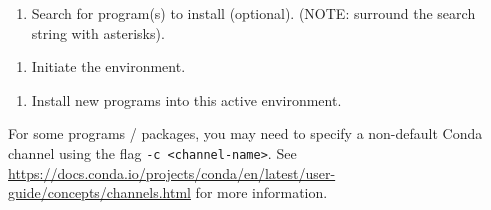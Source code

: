 \documentclass[
]{book}
\newenvironment{Shaded}{\begin{snugshade}}{\end{snugshade}}
\newcommand{\NormalTok}[1]{#1}
\newcommand{\OperatorTok}[1]{\textcolor[rgb]{0.81,0.36,0.00}{\textbf{#1}}}
\newcommand{\StringTok}[1]{\textcolor[rgb]{0.31,0.60,0.02}{#1}}
\providecommand{\tightlist}{%
  \setlength{\itemsep}{0pt}\setlength{\parskip}{0pt}}
\begin{document}
\begin{enumerate}
\def\labelenumi{\arabic{enumi}.}
\setcounter{enumi}{7}
\tightlist
\item
  Search for program(s) to install (optional). (NOTE: surround the search string with asterisks).
\end{enumerate}

\begin{Shaded}
\end{Shaded}

\begin{enumerate}
\def\labelenumi{\arabic{enumi}.}
\setcounter{enumi}{8}
\tightlist
\item
  Initiate the environment.
\end{enumerate}

\begin{Shaded}
\end{Shaded}

\begin{enumerate}
\def\labelenumi{\arabic{enumi}.}
\setcounter{enumi}{9}
\tightlist
\item
  Install new programs into this active environment.
\end{enumerate}

\begin{Shaded}
\end{Shaded}

For some programs / packages, you may need to specify a non-default Conda channel using the flag \texttt{-c\ \textless{}channel-name\textgreater{}}. See \url{https://docs.conda.io/projects/conda/en/latest/user-guide/concepts/channels.html} for more information.
\end{document}
